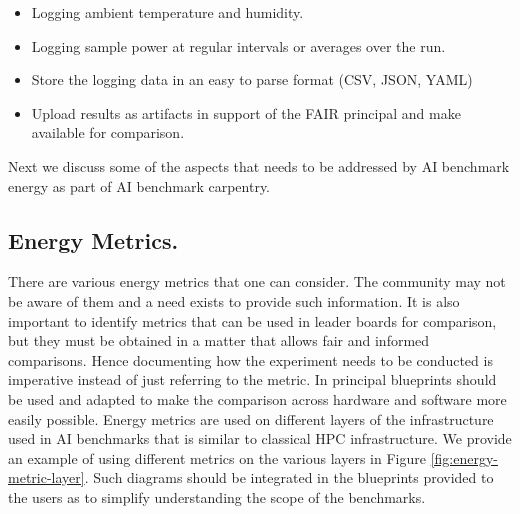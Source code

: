 \begin{itemize}
    \item Logging ambient temperature and humidity.
    \item Logging sample power at regular intervals or averages over the run.
    \item Store the logging data in an easy to parse format (CSV, JSON, YAML) 
    \item Upload results as artifacts in support of the FAIR principal and make available for comparison.
\end{itemize}

Next we discuss some of the aspects that needs to be addressed by AI benchmark energy as part of AI benchmark carpentry.


\subsection{Energy Metrics.}

There are various energy metrics that one can consider. The community may not be aware of them and a need exists to provide such information. It is also important to identify metrics that can be used in leader boards for comparison, but they must be obtained in a matter that allows fair and informed comparisons. Hence documenting how the experiment needs to be conducted is imperative instead of just referring to the metric. In principal blueprints should be used and adapted to make the comparison across hardware and software more easily possible. Energy metrics are used on different layers of the infrastructure used in AI benchmarks that is similar to classical HPC infrastructure. We provide an example of using different metrics on the various layers in Figure \ref{fig:energy-metric-layer}. Such diagrams should be integrated in the blueprints provided to the users as to simplify understanding the scope of the benchmarks.



